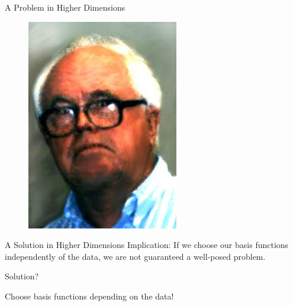 \documentclass[12pt,t]{beamer}
\newcommand{\subt}[1]{{\footnotesize \color{subtitle} {#1}}}
\begin{document}
\begin{frame}{A Problem in Higher Dimensions}
\begin{figure}[!htb]
  \includegraphics[width=\linewidth]{Curtis.jpg}
\endminipage
\end{figure}


\note{}
\end{frame}

\begin{frame}[c]{A Solution in Higher Dimensions}
\subt{Implication:}
If we choose our basis functions independently of the data, we are not guaranteed a well-posed problem.
\bigskip

\subt{Solution?}

Choose basis functions depending on the data!
\bigskip

\note{}
\end{frame}
\end{document}
